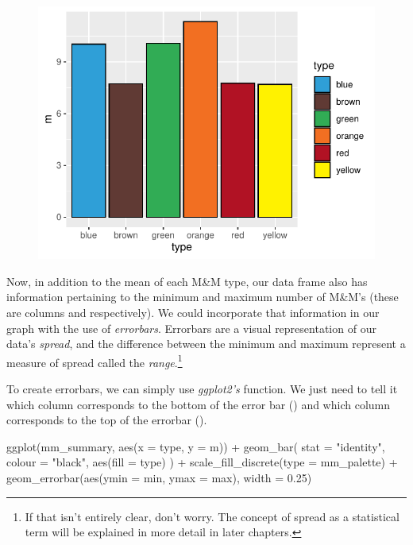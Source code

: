 \vspace{2em}

\begin{figure}[H]
\includegraphics[scale = .75]{graphics/ch3Figs/bar_2.pdf}
\end{figure}

Now, in addition to the mean of each M\&M type, our data frame also has information pertaining to the minimum and maximum number of M\&M's (these are columns  and  respectively). We could incorporate that information in our graph with the use of \textit{errorbars}.  Errorbars are a visual representation of our data's \textit{spread}, and the difference between the minimum and maximum represent a measure of spread called the \textit{range}.\footnote{If that isn't entirely clear, don't worry. The concept of spread as a statistical term will be explained in more detail in later chapters.}

To create errorbars, we can simply use \textit{ggplot2's}  function. We just need to tell it which column corresponds to the bottom of the error bar () and which column corresponds to the top of the errorbar ().

\begin{inR}
ggplot(mm_summary, aes(x = type, y = m)) +
  geom_bar(
    stat = "identity",
    colour = "black",
    aes(fill = type)
  ) +
  scale_fill_discrete(type = mm_palette) +
  geom_errorbar(aes(ymin = min, ymax = max), width = 0.25)
\end{inR}

\vspace{2em}

